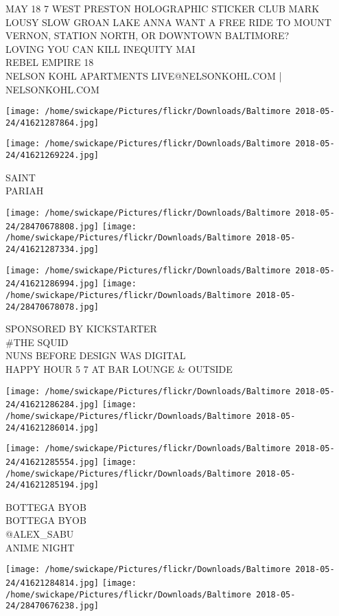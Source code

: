 \documentclass[10pt,letterpaper]{article}
\begin{document}
MAY 18 7 WEST PRESTON HOLOGRAPHIC STICKER CLUB MARK LOUSY SLOW GROAN LAKE ANNA WANT A FREE RIDE TO MOUNT VERNON, STATION NORTH, OR DOWNTOWN BALTIMORE?\\
LOVING YOU CAN KILL INEQUITY MAI\\
REBEL EMPIRE 18\\
NELSON KOHL APARTMENTS LIVE@NELSONKOHL.COM | NELSONKOHL.COM
\pagebreak

\texttt{[image: /home/swickape/Pictures/flickr/Downloads/Baltimore 2018-05-24/41621287864.jpg]}

\vspace{0.25in}
\texttt{[image: /home/swickape/Pictures/flickr/Downloads/Baltimore 2018-05-24/41621269224.jpg]}

SAINT\\
PARIAH
\pagebreak

\texttt{[image: /home/swickape/Pictures/flickr/Downloads/Baltimore 2018-05-24/28470678808.jpg]}
\texttt{[image: /home/swickape/Pictures/flickr/Downloads/Baltimore 2018-05-24/41621287334.jpg]}

\texttt{[image: /home/swickape/Pictures/flickr/Downloads/Baltimore 2018-05-24/41621286994.jpg]}
\texttt{[image: /home/swickape/Pictures/flickr/Downloads/Baltimore 2018-05-24/28470678078.jpg]}

SPONSORED BY KICKSTARTER\\
\#THE SQUID\\
NUNS BEFORE DESIGN WAS DIGITAL\\
HAPPY HOUR 5 7 AT BAR LOUNGE \& OUTSIDE
\pagebreak

\texttt{[image: /home/swickape/Pictures/flickr/Downloads/Baltimore 2018-05-24/41621286284.jpg]}
\texttt{[image: /home/swickape/Pictures/flickr/Downloads/Baltimore 2018-05-24/41621286014.jpg]}

\texttt{[image: /home/swickape/Pictures/flickr/Downloads/Baltimore 2018-05-24/41621285554.jpg]}
\texttt{[image: /home/swickape/Pictures/flickr/Downloads/Baltimore 2018-05-24/41621285194.jpg]}

BOTTEGA BYOB\\
BOTTEGA BYOB\\
@ALEX\_SABU\\
ANIME NIGHT
\pagebreak

\texttt{[image: /home/swickape/Pictures/flickr/Downloads/Baltimore 2018-05-24/41621284814.jpg]}
\texttt{[image: /home/swickape/Pictures/flickr/Downloads/Baltimore 2018-05-24/28470676238.jpg]}
\end{document}
